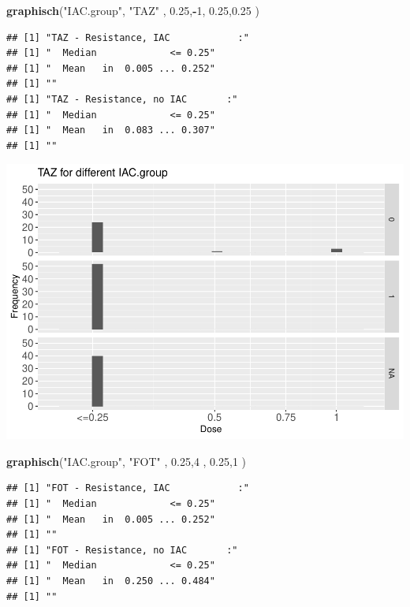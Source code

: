 \documentclass[
]{article}
\newenvironment{Shaded}{\begin{snugshade}}{\end{snugshade}}
\newcommand{\DecValTok}[1]{\textcolor[rgb]{0.00,0.00,0.81}{#1}}
\newcommand{\FloatTok}[1]{\textcolor[rgb]{0.00,0.00,0.81}{#1}}
\newcommand{\KeywordTok}[1]{\textcolor[rgb]{0.13,0.29,0.53}{\textbf{#1}}}
\newcommand{\NormalTok}[1]{#1}
\newcommand{\OperatorTok}[1]{\textcolor[rgb]{0.81,0.36,0.00}{\textbf{#1}}}
\newcommand{\StringTok}[1]{\textcolor[rgb]{0.31,0.60,0.02}{#1}}
\begin{document}
\begin{Shaded}
\begin{Highlighting}[]
   \KeywordTok{graphisch}\NormalTok{(}\StringTok{"IAC.group"}\NormalTok{, }\StringTok{"TAZ"}\NormalTok{ , }\FloatTok{0.25}\NormalTok{,}\OperatorTok{-}\DecValTok{1}\NormalTok{,   }\FloatTok{0.25}\NormalTok{,}\FloatTok{0.25}\NormalTok{ )  }
\end{Highlighting}
\end{Shaded}

\begin{verbatim}
## [1] "TAZ - Resistance, IAC            :"
## [1] "  Median             <= 0.25"
## [1] "  Mean   in  0.005 ... 0.252"
## [1] ""
## [1] "TAZ - Resistance, no IAC       :"
## [1] "  Median             <= 0.25"
## [1] "  Mean   in  0.083 ... 0.307"
## [1] ""
\end{verbatim}

\includegraphics{Verteilungen_files/figure-latex/unnamed-chunk-11-1.pdf}

\begin{Shaded}
\begin{Highlighting}[]
  \KeywordTok{graphisch}\NormalTok{(}\StringTok{"IAC.group"}\NormalTok{, }\StringTok{"FOT"}\NormalTok{ , }\FloatTok{0.25}\NormalTok{,}\DecValTok{4}\NormalTok{   ,   }\FloatTok{0.25}\NormalTok{,}\DecValTok{1}\NormalTok{     )  }
\end{Highlighting}
\end{Shaded}

\begin{verbatim}
## [1] "FOT - Resistance, IAC            :"
## [1] "  Median             <= 0.25"
## [1] "  Mean   in  0.005 ... 0.252"
## [1] ""
## [1] "FOT - Resistance, no IAC       :"
## [1] "  Median             <= 0.25"
## [1] "  Mean   in  0.250 ... 0.484"
## [1] ""
\end{verbatim}
\end{document}
